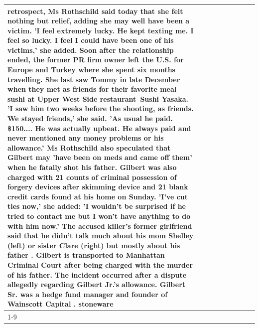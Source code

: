 \begin{table}[H]
\begin{tabular}{lllrlllll}
retrospect, Ms Rothschild said today that she felt nothing but relief, adding she may well have been a victim. 'I feel extremely lucky. He kept texting me. I feel so lucky. I feel I could have been one of his victims,' she added. Soon after the relationship ended, the former PR firm owner left the U.S. for Europe and Turkey where she spent six months  travelling. She last saw Tommy in late December when they met as friends for their favorite meal sushi at Upper West Side restaurant Sushi Yasaka. 'I saw him two weeks before the shooting, as friends. We stayed friends,' she said. 'As usual he paid. \$150.... He was actually upbeat. He always paid and never mentioned any money problems or his allowance.' Ms Rothschild also speculated that Gilbert may 'have been on meds and came off them' when he fatally shot his father. Gilbert was also charged with 21 counts of criminal possession of forgery devices after skimming device and 21 blank credit cards found at his home on Sunday. 'I've cut ties now,' she added: 'I wouldn’t be surprised if he tried to contact me but I won’t have anything to do with him now.' The accused killer's former girlfriend said that he didn't talk much about his mom Shelley (left) or sister Clare (right) but mostly about his father . Gilbert is transported to Manhattan Criminal Court  after being charged with the murder of his father. The incident occurred after a dispute allegedly regarding Gilbert Jr.'s allowance. Gilbert Sr. was a hedge fund manager and founder of Wainscott Capital . stoneware \\
\cline{1-9}

\end{tabular}
\end{table}
